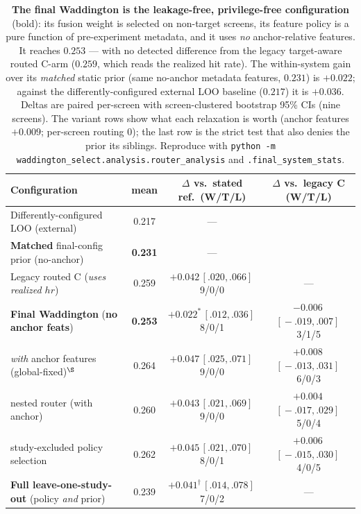 \documentclass[11pt]{article}
\begin{document}
\begin{table}[H]
\centering
\caption{\textbf{The final Waddington is the leakage-free, privilege-free configuration} (bold): its
fusion weight is selected on non-target screens, its feature policy is a pure function of pre-experiment
metadata, and it uses \emph{no} anchor-relative features. It reaches $0.253$ --- with no detected
difference from the legacy target-aware routed C-arm ($0.259$, which reads the realized hit rate). The
within-system gain over its \emph{matched} static prior (same no-anchor metadata features, $0.231$) is
$+0.022$; against the differently-configured external LOO baseline ($0.217$) it is $+0.036$. Deltas are
paired per-screen with screen-clustered bootstrap 95\% CIs (nine screens). The variant rows show what each
relaxation is worth (anchor features $+0.009$; per-screen routing $0$); the last row is the strict test
that also denies the prior its siblings. Reproduce with
\texttt{python -m waddington\_select.analysis.router\_analysis} and \texttt{.final\_system\_stats}.}
\label{tab:honest_router}
\small
\setlength{\tabcolsep}{4pt}
\begin{tabular}{lccc}
\toprule
Configuration & mean & \multicolumn{1}{c}{$\Delta$ vs.\ stated ref.\ (W/T/L)} & \multicolumn{1}{c}{$\Delta$ vs.\ legacy C (W/T/L)} \\
\midrule
Differently-configured LOO (external) & 0.217 & --- & \\
\textbf{Matched} final-config prior (no-anchor) & \textbf{0.231} & --- & \\
Legacy routed C (\emph{uses realized $hr$})   & 0.259 & $+0.042$\,{\tiny$[.020,.066]$}\,9/0/0 & --- \\
\midrule
\textbf{Final Waddington} (\textbf{no anchor feats}) & \textbf{0.253} & $+0.022^{*}$\,{\tiny$[.012,.036]$}\,8/0/1 & $-0.006$\,{\tiny$[\!-\!.019,.007]$}\,3/1/5 \\
\quad\emph{with} anchor features (global-fixed)$^{\S}$ & 0.264 & $+0.047$\,{\tiny$[.025,.071]$}\,9/0/0 & $+0.008$\,{\tiny$[\!-\!.013,.031]$}\,6/0/3 \\
\quad nested router (with anchor)             & 0.260 & $+0.043$\,{\tiny$[.021,.069]$}\,9/0/0 & $+0.004$\,{\tiny$[\!-\!.017,.029]$}\,5/0/4 \\
\quad study-excluded policy selection         & 0.262 & $+0.045$\,{\tiny$[.021,.070]$}\,8/0/1 & $+0.006$\,{\tiny$[\!-\!.015,.030]$}\,4/0/5 \\
\midrule
\textbf{Full leave-one-study-out} (policy \emph{and} prior) & 0.239 & $+0.041^{\dagger}$\,{\tiny$[.014,.078]$}\,7/0/2 & --- \\

\end{tabular}
\end{table}
\end{document}
